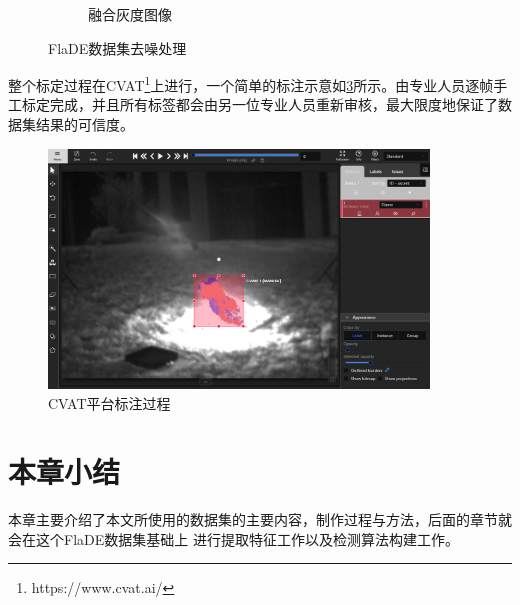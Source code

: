 \begin{figure}[ht]
\begin{subfigure}{0.49\textwidth}
        \caption{融合灰度图像}
        \label{subfig:FlaDE_project_02}
    \end{subfigure}
    \caption{FlaDE数据集去噪处理}
\end{figure}

整个标定过程在CVAT\footnote{https://www.cvat.ai/}上进行，一个简单的标注示意如\ref{fig:annotation}所示。由专业人员逐帧手工标定完成，并且所有标签都会由另一位专业人员重新审核，最大限度地保证了数据集结果的可信度。

\begin{figure}
    \centering
    \includegraphics[width=0.9\textwidth]{figures/annotation.png}
    \caption{CVAT平台标注过程}
    \label{fig:annotation}
\end{figure}

\section{本章小结}
本章主要介绍了本文所使用的数据集的主要内容，制作过程与方法，后面的章节就会在这个FlaDE数据集基础上
进行提取特征工作以及检测算法构建工作。